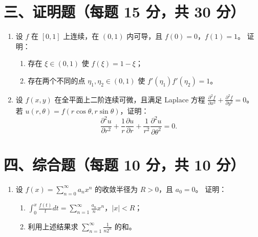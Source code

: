 \documentclass[12pt,a4paper]{ctexart}
\begin{document}
\section*{三、证明题（每题 15 分，共 30 分）}

\begin{enumerate}[leftmargin=*,label=\arabic*.,start=9]
  \item 设 $f$ 在 $[0,1]$ 上连续，在 $(0,1)$ 内可导，且 $f(0)=0$，$f(1)=1$。
    证明：
    \begin{enumerate}
      \item 存在 $\xi \in (0,1)$ 使 $f(\xi) = 1-\xi$；
      \item 存在两个不同的点 $\eta_1, \eta_2 \in (0,1)$ 使 $f'(\eta_1)f'(\eta_2)=1$。
    \end{enumerate}

  \item 设 $f(x,y)$ 在全平面上二阶连续可微，且满足 Laplace 方程
    $\frac{\partial^2 f}{\partial x^2} + \frac{\partial^2 f}{\partial y^2} = 0$。
    若 $u(r,\theta) = f(r\cos\theta, r\sin\theta)$，证明：
    \[
    \frac{\partial^2 u}{\partial r^2} + \frac{1}{r}\frac{\partial u}{\partial r}
    + \frac{1}{r^2}\frac{\partial^2 u}{\partial\theta^2} = 0.
    \]
\end{enumerate}

\section*{四、综合题（每题 10 分，共 10 分）}

\begin{enumerate}[leftmargin=*,label=\arabic*.,start=11]
  \item 设 $f(x) = \sum_{n=0}^{\infty} a_n x^n$ 的收敛半径为 $R > 0$，且 $a_0 = 0$。
    证明：
    \begin{enumerate}
      \item $\int_0^x \frac{f(t)}{t} dt = \sum_{n=1}^{\infty} \frac{a_n}{n} x^n$，$|x| < R$；
      \item 利用上述结果求 $\displaystyle\sum_{n=1}^{\infty}\frac{1}{n 2^n}$ 的和。
    \end{enumerate}
\end{enumerate}
\end{document}
